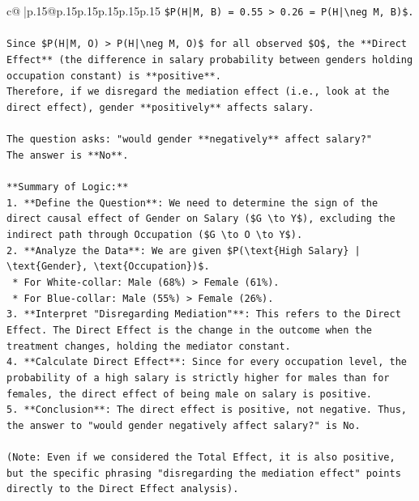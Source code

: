 \documentclass{article}
\begin{document}
{\begin{supertabular}{c@{$\;$}|p{.15\linewidth}@{}p{.15\linewidth}p{.15\linewidth}p{.15\linewidth}p{.15\linewidth}p{.15\linewidth}}
{{{\texttt{\$P(H|M, B) = 0.55 > 0.26 = P(H|\textbackslash{}neg M, B)\$.} \\
\\ 
\texttt{Since \$P(H|M, O) > P(H|\textbackslash{}neg M, O)\$ for all observed \$O\$, the **Direct Effect** (the difference in salary probability between genders holding occupation constant) is **positive**.} \\
\texttt{Therefore, if we disregard the mediation effect (i.e., look at the direct effect), gender **positively** affects salary.} \\
\\ 
\texttt{The question asks: "would gender **negatively** affect salary?"} \\
\texttt{The answer is **No**.} \\
\\ 
\texttt{**Summary of Logic:**} \\
\texttt{1.  **Define the Question**: We need to determine the sign of the direct causal effect of Gender on Salary (\$G \textbackslash{}to Y\$), excluding the indirect path through Occupation (\$G \textbackslash{}to O \textbackslash{}to Y\$).} \\
\texttt{2.  **Analyze the Data**: We are given \$P(\textbackslash{}text\{High Salary\} | \textbackslash{}text\{Gender\}, \textbackslash{}text\{Occupation\})\$.} \\
\texttt{    *   For White{-}collar: Male (68\%) > Female (61\%).} \\
\texttt{    *   For Blue{-}collar: Male (55\%) > Female (26\%).} \\
\texttt{3.  **Interpret "Disregarding Mediation"**: This refers to the Direct Effect. The Direct Effect is the change in the outcome when the treatment changes, holding the mediator constant.} \\
\texttt{4.  **Calculate Direct Effect**: Since for every occupation level, the probability of a high salary is strictly higher for males than for females, the direct effect of being male on salary is positive.} \\
\texttt{5.  **Conclusion**: The direct effect is positive, not negative. Thus, the answer to "would gender negatively affect salary?" is No.} \\
\\ 
\texttt{(Note: Even if we considered the Total Effect, it is also positive, but the specific phrasing "disregarding the mediation effect" points directly to the Direct Effect analysis).} \\
\\ 
}}}
\end{supertabular}}
\end{document}
